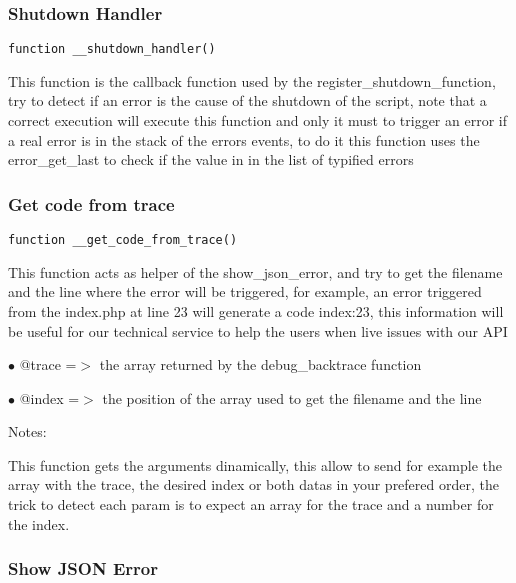 \documentclass[a4paper]{article}
\begin{document}
\subsubsection{Shutdown Handler}

\begin{lstlisting}
function __shutdown_handler()
\end{lstlisting}

This function is the callback function used by the register\_shutdown\_function, try to
detect if an error is the cause of the shutdown of the script, note that a correct
execution will execute this function and only it must to trigger an error if a real
error is in the stack of the errors events, to do it this function uses the error\_get\_last
to check if the value in in the list of typified errors

\hypertarget{toc118}{}
\subsubsection{Get code from trace}

\begin{lstlisting}
function __get_code_from_trace()
\end{lstlisting}

This function acts as helper of the show\_json\_error, and try to get the filename and the line
where the error will be triggered, for example, an error triggered from the index.php at line
23 will generate a code index:23, this information will be useful for our technical service
to help the users when live issues with our API

\begin{compactitem}
\item[\color{myblue}$\bullet$] @trace =$>$ the array returned by the debug\_backtrace function
\item[\color{myblue}$\bullet$] @index =$>$ the position of the array used to get the filename and the line
\end{compactitem}

Notes:

This function gets the arguments dinamically, this allow to send for example the array with
the trace, the desired index or both datas in your prefered order, the trick to detect each
param is to expect an array for the trace and a number for the index.

\hypertarget{toc119}{}
\subsubsection{Show JSON Error}
\end{document}

